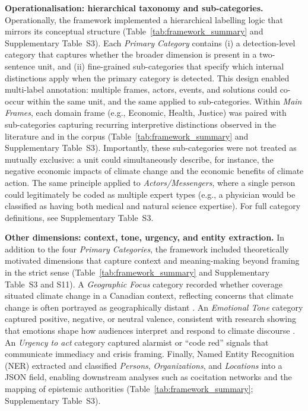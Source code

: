 \documentclass[12pt]{article}
\renewcommand\_{\texttt{\detokenize{_}\allowbreak}}
\begin{document}
{\bfseries{Operationalisation: hierarchical taxonomy and sub-categories.}} Operationally, the framework implemented a hierarchical labelling logic that mirrors its conceptual structure (Table~\ref{tab:framework_summary} and Supplementary Table~S3). Each \emph{Primary Category} contains (i) a detection-level category that captures whether the broader dimension is present in a two-sentence unit, and (ii) fine-grained sub-categories that specify which internal distinctions apply when the primary category is detected. This design enabled multi-label annotation: multiple frames, actors, events, and solutions could co-occur within the same unit, and the same applied to sub-categories. Within \emph{Main Frames}, each domain frame (e.g., Economic, Health, Justice) was paired with sub-categories capturing recurring interpretive distinctions observed in the literature and in the corpus (Table~\ref{tab:framework_summary} and Supplementary Table~S3). Importantly, these sub-categories were not treated as mutually exclusive: a unit could simultaneously describe, for instance, the negative economic impacts of climate change and the economic benefits of climate action. The same principle applied to \emph{Actors/Messengers}, where a single person could legitimately be coded as multiple expert types (e.g., a physician would be classified as having both medical and natural science expertise). For full category definitions, see Supplementary Table~S3.

{\bfseries{Other dimensions: context, tone, urgency, and entity extraction.}} In addition to the four \emph{Primary Categories}, the framework included theoretically motivated dimensions that capture context and meaning-making beyond framing in the strict sense (Table~\ref{tab:framework_summary} and Supplementary Table~S3 and S11). A \emph{Geographic Focus} category recorded whether coverage situated climate change in a Canadian context, reflecting concerns that climate change is often portrayed as geographically distant \autocite{moser_reflections_2016}. An \emph{Emotional Tone} category captured positive, negative, or neutral valence, consistent with research showing that emotions shape how audiences interpret and respond to climate discourse \autocite{salama_role_2018, nabi_framing_2018}. An \emph{Urgency to act} category captured alarmist or ``code red'' signals that communicate immediacy and crisis framing. Finally, Named Entity Recognition (NER) extracted and classified \emph{Persons}, \emph{Organizations}, and \emph{Locations} into a JSON field, enabling downstream analyses such as cocitation networks and the mapping of epistemic authorities (Table~\ref{tab:framework_summary}; Supplementary Table~S3).
\end{document}
